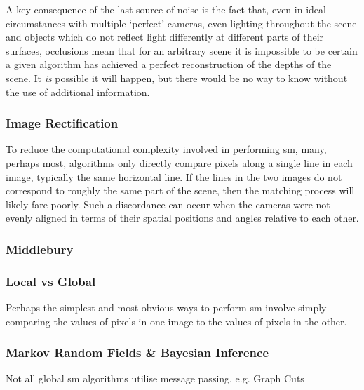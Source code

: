 A key consequence of the last source of noise is the fact that, even in ideal circumstances with multiple `perfect' cameras, even lighting throughout the scene and objects which do not reflect light differently at different parts of their surfaces, occlusions mean that for an arbitrary scene it is impossible to be certain a given algorithm has achieved a perfect reconstruction of the depths of the scene.  It \emph{is} possible it will happen, but there would be no way to know without the use of additional information.


\subsubsection{Image Rectification}
To reduce the computational complexity involved in performing \gls{sm}, many, perhaps most, algorithms only directly compare pixels along a single line in each image, typically the same horizontal line.  If the lines in the two images do not correspond to roughly the same part of the scene, then the matching process will likely fare poorly.  Such a discordance can occur when the cameras were not evenly aligned in terms of their spatial positions and angles relative to each other.  

\subsubsection{Middlebury}

\subsubsection{Local vs Global}
\cite{Scharstein2002}

Perhaps the simplest and most obvious ways to perform \gls{sm} involve simply comparing the values of pixels in one image to the values of pixels in the other.

\subsubsection{Markov Random Fields \& Bayesian Inference}
\cite{Kolmogorov2015,Blake2011}

Not all global \gls{sm} algorithms utilise message passing, e.g. Graph Cuts \cite{Kolmogorov2001,Tappen2003}

